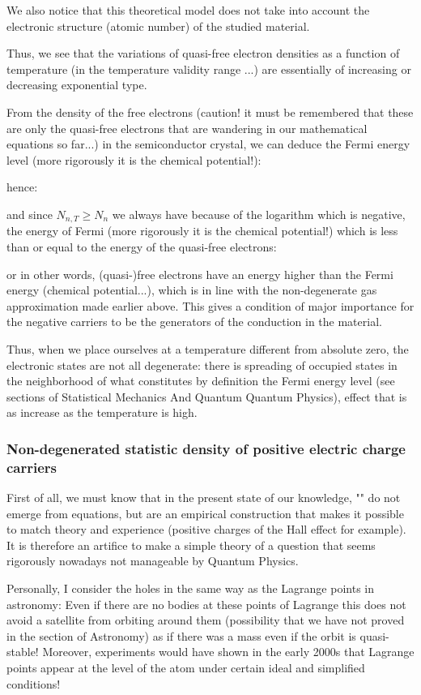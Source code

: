 	We also notice that this theoretical model does not take into account the electronic structure (atomic number) of the studied material.

	Thus, we see that the variations of quasi-free electron densities as a function of temperature (in the temperature validity range ...) are essentially of increasing or decreasing exponential type.

	From the density of the free electrons (caution! it must be remembered that these are only the quasi-free electrons that are wandering in our mathematical equations so far...) in the semiconductor crystal, we can deduce the Fermi energy level (more rigorously it is the chemical potential!):
	
	hence:
	
	and since $N_{n,T}\ge N_n$ we always have because of the logarithm which is negative, the energy of Fermi (more rigorously it is the chemical potential!) which is less than or equal to the energy of the quasi-free electrons:
	
	or in other words, (quasi-)free electrons have an energy higher than the Fermi energy (chemical potential...), which is in line with the non-degenerate gas approximation made earlier above. This gives a condition of major importance for the negative carriers to be the generators of the conduction in the material.

	Thus, when we place ourselves at a temperature different from absolute zero, the electronic states are not all degenerate: there is spreading of occupied states in the neighborhood of what constitutes by definition the Fermi energy level (see sections of Statistical Mechanics And Quantum Quantum Physics), effect that is as increase as the temperature is high.
	
	\subsubsection{Non-degenerated statistic density of positive electric charge carriers}
	First of all, we must know that in the present state of our knowledge, "" do not emerge from equations, but are an empirical construction that makes it possible to match theory and experience (positive charges of the Hall effect for example). It is therefore an artifice to make a simple theory of a question that seems rigorously nowadays not manageable by Quantum Physics.

	Personally, I consider the holes in the same way as the Lagrange points in astronomy: Even if there are no bodies at these points of Lagrange this does not avoid a satellite from orbiting around them (possibility that we have not proved in the section of Astronomy) as if there was a mass even if the orbit is quasi-stable! Moreover, experiments would have shown in the early 2000s that Lagrange points appear at the level of the atom under certain ideal and simplified conditions!

